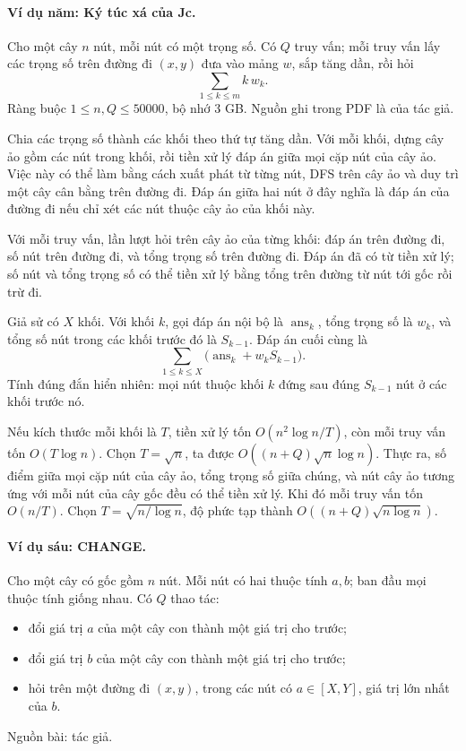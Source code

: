 \documentclass[11pt]{article}
\begin{document}
\paragraph{Ví dụ năm: Ký túc xá của Jc.}
Cho một cây \(n\) nút, mỗi nút có một trọng số. Có \(Q\) truy vấn; mỗi truy
vấn lấy các trọng số trên đường đi \((x,y)\) đưa vào mảng \(w\), sắp tăng dần,
rồi hỏi
\[
  \sum_{1\le k\le m} k\,w_k.
\]
Ràng buộc \(1\le n,Q\le 50000\), bộ nhớ 3 GB. Nguồn ghi trong PDF là của tác
giả.

Chia các trọng số thành các khối theo thứ tự tăng dần. Với mỗi khối, dựng cây
ảo gồm các nút trong khối, rồi tiền xử lý đáp án giữa mọi cặp nút của cây ảo.
Việc này có thể làm bằng cách xuất phát từ từng nút, DFS trên cây ảo và duy
trì một cây cân bằng trên đường đi. Đáp án giữa hai nút ở đây nghĩa là đáp án
của đường đi nếu chỉ xét các nút thuộc cây ảo của khối này.

Với mỗi truy vấn, lần lượt hỏi trên cây ảo của từng khối: đáp án trên đường
đi, số nút trên đường đi, và tổng trọng số trên đường đi. Đáp án đã có từ tiền
xử lý; số nút và tổng trọng số có thể tiền xử lý bằng tổng trên đường từ nút
tới gốc rồi trừ đi.

Giả sử có \(X\) khối. Với khối \(k\), gọi đáp án nội bộ là
\(\operatorname{ans}_k\), tổng trọng số là \(w_k\), và tổng số nút trong các
khối trước đó là \(S_{k-1}\). Đáp án cuối cùng là
\[
  \sum_{1\le k\le X}\bigl(\operatorname{ans}_k+w_kS_{k-1}\bigr).
\]
Tính đúng đắn hiển nhiên: mọi nút thuộc khối \(k\) đứng sau đúng
\(S_{k-1}\) nút ở các khối trước nó.

Nếu kích thước mỗi khối là \(T\), tiền xử lý tốn
\(O(n^2\log n/T)\), còn mỗi truy vấn tốn \(O(T\log n)\). Chọn
\(T=\sqrt n\), ta được \(O((n+Q)\sqrt n\log n)\). Thực ra, số điểm giữa mọi cặp
nút của cây ảo, tổng trọng số giữa chúng, và nút cây ảo tương ứng với mỗi nút
của cây gốc đều có thể tiền xử lý. Khi đó mỗi truy vấn tốn \(O(n/T)\). Chọn
\(T=\sqrt{n/\log n}\), độ phức tạp thành \(O((n+Q)\sqrt{n\log n})\).

\paragraph{Ví dụ sáu: CHANGE.}
Cho một cây có gốc gồm \(n\) nút. Mỗi nút có hai thuộc tính \(a,b\); ban đầu
mọi thuộc tính giống nhau. Có \(Q\) thao tác:
\begin{itemize}
  \item đổi giá trị \(a\) của một cây con thành một giá trị cho trước;
  \item đổi giá trị \(b\) của một cây con thành một giá trị cho trước;
  \item hỏi trên một đường đi \((x,y)\), trong các nút có
  \(a\in[X,Y]\), giá trị lớn nhất của \(b\).
\end{itemize}
Nguồn bài: tác giả.
\end{document}

